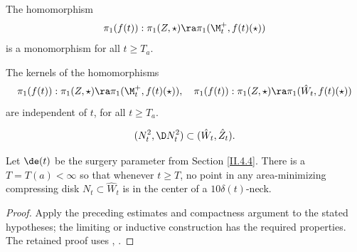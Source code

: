 \begin{proposition}
  \label{prop:kl-incompressibility-cuspidal-tori-incompressibility-cuspidal-tori-proposition}

\label{propincompressible}
The homomorphism
\begin{equation} \label{injeqn}
\pi_1(f(t)):\pi_1(Z,\star)\ra \pi_1(\M_t^+,f(t)(\star))
\end{equation}
is a monomorphism for all $t\geq T_a$.
\end{proposition}

\begin{lemma}
  \label{lem:kl-incompressibility-cuspidal-tori-incompressibility-cuspidal-tori-lemma}
 \label{stablelemma}
The kernels of the homomorphisms
\begin{equation}
\label{eqnpi1inclusion}
\pi_1(f(t)):\pi_1(Z,\star)\ra \pi_1(\M_t^+,f(t)(\star)),\quad
\pi_1(f(t)):\pi_1(Z,\star)\ra \pi_1(\hat W_t,f(t)(\star))
\end{equation}
are independent of $t$, for all $t\geq T_a$.
\end{lemma}

\begin{equation}
(N^2_t,\D N^2_t)\subset (\hat W_t,\hat Z_t).
\end{equation}

\begin{lemma}
  \label{lem:kl-incompressibility-cuspidal-tori-existence-ricci-flow-surgery}

\label{lemavoids}
Let $\de(t)$ be the surgery parameter from
Section \ref{II.4.4}. There is a $T = T(a) < \infty$ so that whenever $t \ge T$,
no point in any area-minimizing compressing disk  $N_t\subset \hat W_t$ is in the
center of a $10 \delta(t)$-neck.
\end{lemma}

\begin{proof}
\sketch Apply the preceding estimates and compactness argument to the stated hypotheses; the limiting or inductive construction has the required properties.
The retained proof uses \cite{schoen}, \cite[Theorem 2]{schoenyau}.
\end{proof}

